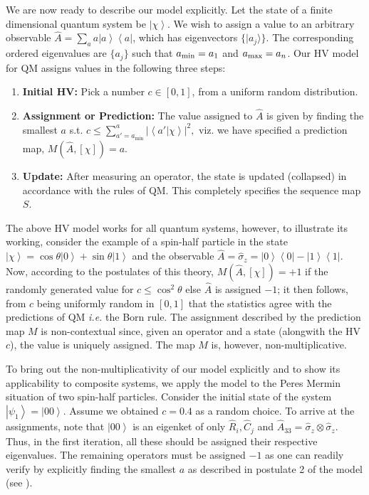 \documentclass[british,aps,prl,superscriptaddress,nofootinbib,times,reprint]{revtex4-1}
\theoremstyle{plain}
\theoremstyle{plain}
\theoremstyle{definition}
\theoremstyle{remark}
\theoremstyle{remark}
\theoremstyle{remark}
\theoremstyle{plain}
\theoremstyle{plain}
\theoremstyle{plain}
\theoremstyle{definition}
\theoremstyle{definition}
\begin{document}
We are now ready to describe our 
model explicitly.
Let the state of a finite dimensional quantum
system be $\left|\chi\right\rangle $. We wish to
assign a value to an arbitrary observable
$\hat{A}=\sum_{a}a\left|a\right\rangle
\left\langle a\right|$, which has eigenvectors $\{
\vert a_j\rangle \}$. The corresponding ordered
eigenvalues are $\{a_j\}$ such that $a_{\rm
min}=a_1$ and $a_{\rm max}=a_n$.  Our HV model for
QM assigns values in the following three steps:
\setdefaultleftmargin{0pt}{}{}{}{}{}
\begin{enumerate}
\item
{\bf  Initial HV:} Pick a number
$c\in[0,1]$, from a uniform random distribution.\
\item
{\bf
Assignment or Prediction:}
 The value assigned to
$\hat{A}$ is given by finding the smallest $a$
s.t.  $c\le\sum_{a'=a_{\text{min}}}^{a}\left|\left\langle
a'|\chi\right\rangle \right|^{2},$ viz. we have
specified a prediction map, $M(\hat{A},[\chi ])=a$.
\item
{\bf  Update:} After measuring an operator, the state is
updated (collapsed) in accordance with the rules
of QM. This completely specifies the sequence map
$S$.
\end{enumerate}
The above HV model works for all quantum systems,
however, to illustrate its working,
consider the example of a spin-half particle in the state
$\left|\chi\right\rangle
=\cos\theta\left|0\right\rangle
+\sin\theta\left|1\right\rangle $ and the observable
$\hat{A}=\hat{\sigma}_{z}=\left|0\right\rangle
\left\langle 0\right|-\left|1\right\rangle
\left\langle 1\right|$. Now, according to the
postulates of this theory, $M(\hat{A},[\chi])=+1$
if
the randomly generated value for 
$c\le\cos^{2}\theta$ else $\hat{A}$ is assigned
$-1$; it then follows,  from $c$ being uniformly
random in $[0,1]$ that the statistics agree with
the predictions of QM {\it i.e.}  the
Born rule. 
The assignment described by the
prediction map $M$ is non-contextual since, given
an operator and a state (alongwith the HV $c$), the value is
uniquely assigned. The map $M$ is, however,
non-multiplicative.


To bring out the non-multiplicativity of our model 
explicitly and to show its
applicability to composite systems,
we apply the model to the Peres Mermin situation of two
spin-half particles. Consider the initial state of
the system 
$\left|\psi_{1}\right\rangle
=\left|00\right\rangle $. Assume we 
obtained $c=0.4$ as a random choice. To arrive
at the assignments, note that
$\left|00\right\rangle $ is an eigenket of only
$\hat{R}_{i},\hat{C}_{j}$ and
$\hat{A}_{33}=\hat{\sigma}_{z}\otimes\hat{\sigma}_{z}$.
Thus, in the first iteration, all these should be
assigned their respective eigenvalues. The
remaining operators must be assigned $-1$ as one
can readily verify by explicitly finding the
smallest $a$ as described in postulate 2 of the
model (see ). 
\end{document}
